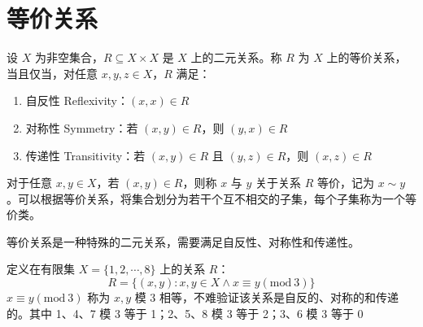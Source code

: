 \section{等价关系}

\begin{definition}
    设 $ X $ 为非空集合，$ R\subseteq X\times X $ 是 $X$ 上的二元关系。称 $ R $ 为 $ X $ 上的等价关系，当且仅当，对任意 $ x,y,z\in X $，$ R $ 满足：
    \begin{enumerate}
        \item 自反性 Reflexivity：$ (x,x)\in R $
        \item 对称性 Symmetry：若 $ (x,y)\in R $，则 $ (y,x)\in R $
        \item 传递性 Transitivity：若 $ (x,y)\in R $ 且 $ (y,z)\in R $，则 $ (x,z)\in R $
    \end{enumerate}
    对于任意 $ x,y\in X $，若 $ (x,y)\in R $，则称 $ x $ 与 $ y $ 关于关系 $ R $ 等价，记为 $ x\sim y $。可以根据等价关系，将集合划分为若干个互不相交的子集，每个子集称为一个等价类。
\end{definition}

\begin{note}
    等价关系是一种特殊的二元关系，需要满足自反性、对称性和传递性。
\end{note}
\vspace{1em}

\begin{example}
    定义在有限集 $X=\{1,2,\cdots,8\}$ 上的关系 $R$：
    \[
        R=\{( x,y ) :x,y\in X \wedge x\equiv y(\mathrm{mod}\ 3)\}
    \]
    $ x\equiv y(\mathrm{mod}\ 3) $ 称为 $ x,y $ 模 3 相等，不难验证该关系是自反的、对称的和传递的。其中 1、4、7 模 3 等于 1；2、5、8 模 3 等于 2；3、6 模 3 等于 0
    \label{ex:mod3_equivalence}
\end{example}
\vspace{1em}

